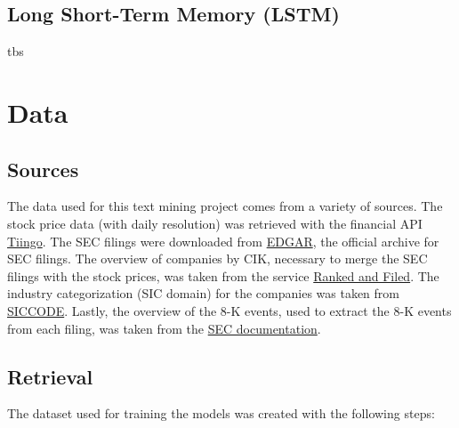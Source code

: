 \documentclass{article}
\begin{document}
	
	\subsection{Long Short-Term Memory (LSTM)}
	
	tbs
	
	\section{Data}
	
	\subsection{Sources}
	
	The data used for this text mining project comes from a variety of sources. The stock price data (with daily resolution) was retrieved with the financial API \href{https://www.tiingo.com}{Tiingo}. The SEC filings were downloaded from \href{https://www.sec.gov/Archives/edgar/full-index/}{EDGAR}, the official archive for SEC filings. The overview of companies by CIK, necessary to merge the SEC filings with the stock prices, was taken from the service \href{http://rankandfiled.com/#/data/tickers}{Ranked and Filed}. The industry categorization (SIC domain) for the companies was taken from \href{https://siccode.com}{SICCODE}. Lastly, the overview of the 8-K events, used to extract the 8-K events from each filing, was taken from the  \href{https://www.sec.gov/fast-answers/answersform8khtm.html}{SEC documentation}. 
	
	\subsection{Retrieval}
	
	The dataset used for training the models was created with the following steps: 
	
\end{document}
